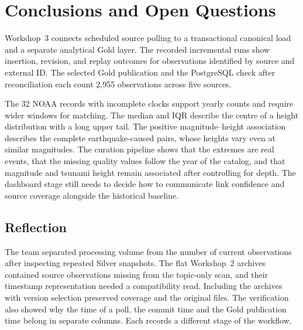 \documentclass[a4paper,11pt,oneside]{book}
\begin{document}
\chapter{Conclusions and Open Questions}
Workshop~3 connects scheduled source polling to a transactional canonical load and a separate analytical Gold layer. The recorded incremental runs show insertion, revision, and replay outcomes for observations identified by source and external ID. The selected Gold publication and the PostgreSQL check after reconciliation each count 2,955 observations across five sources.

The 32 NOAA records with incomplete clocks support yearly counts and require wider windows for matching. The median and IQR describe the centre of a height distribution with a long upper tail. The positive magnitude--height association describes the complete earthquake-caused pairs, whose heights vary even at similar magnitudes. The curation pipeline shows that the extremes are real events, that the missing quality values follow the year of the catalog, and that magnitude and tsunami height remain associated after controlling for depth. The dashboard stage still needs to decide how to communicate link confidence and source coverage alongside the historical baseline.

\section{Reflection}
The team separated processing volume from the number of current observations after inspecting repeated Silver snapshots. The flat Workshop~2 archives contained source observations missing from the topic-only scan, and their timestamp representation needed a compatibility read. Including the archives with version selection preserved coverage and the original files. The verification also showed why the time of a poll, the commit time and the Gold publication time belong in separate columns. Each records a different stage of the workflow.
\end{document}
